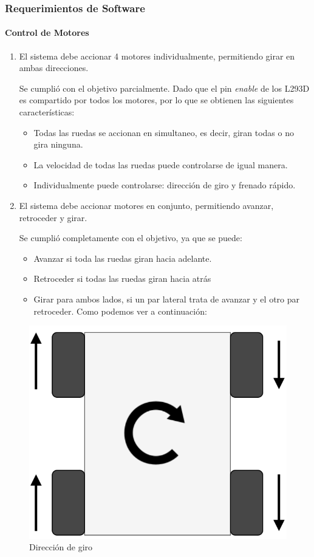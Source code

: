 \subsubsection{Requerimientos de Software}

\paragraph{Control de Motores}

\begin{enumerate}
\def\labelenumi{\arabic{enumi}.}
\item
  El sistema debe accionar 4 motores individualmente, permitiendo girar
  en ambas direcciones.

  Se cumplió con el objetivo parcialmente. Dado que el pin \emph{enable}
  de los L293D es compartido por todos los motores, por lo que se
  obtienen las siguientes características:

  \begin{itemize}
  \tightlist
  \item
    Todas las ruedas se accionan en simultaneo, es decir, giran todas o
    no gira ninguna.\\
  \item
    La velocidad de todas las ruedas puede controlarse de igual manera.
  \item
    Individualmente puede controlarse: dirección de giro y frenado
    rápido.
  \end{itemize}
\item
  El sistema debe accionar motores en conjunto, permitiendo avanzar,
  retroceder y girar.

  Se cumplió completamente con el objetivo, ya que se puede:

	\begin{itemize}
	\tightlist
	\item
	  Avanzar si toda las ruedas giran hacia adelante.
	\item
	  Retroceder si todas las ruedas giran hacia atrás
	\item
	  Girar para ambos lados, si un par lateral trata de avanzar y el otro
	  par retroceder. Como podemos ver a continuación:
	\end{itemize}

\end{enumerate}

\begin{figure}[H]
\centering
\includegraphics[width=0.4\linewidth]{informe_4/diagrama_giro.png}
\caption{Dirección de giro}
\end{figure}

